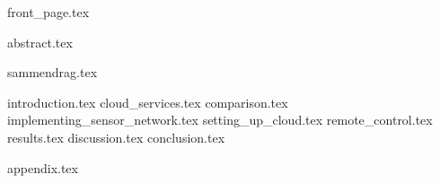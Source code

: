 \documentclass[dvipsnames, b5paper, twoside, openright]{report}
\begin{document}
{front_page.tex}



\setcounter{page}{1}
\setcounter{tocdepth}{3}

\let\cleardoublepage\clearpage
{abstract.tex}


\let\cleardoublepage\clearpage
{sammendrag.tex}


\let\cleardoublepage\clearpage
\tableofcontents
{}

\let\cleardoublepage\clearpage
\listoffigures                                  
{}
\cleardoublepage



\setcounter{page}{1}
\fancyhead[LE,RO]{\itshape \nouppercase \rightmark}
\pagestyle{fancy}

\let\cleardoublepage\clearpage
{introduction.tex}
\let\cleardoublepage\clearpage
{cloud_services.tex}
\let\cleardoublepage\clearpage
{comparison.tex}
\let\cleardoublepage\clearpage
{implementing_sensor_network.tex}
\let\cleardoublepage\clearpage
{setting_up_cloud.tex}
\let\cleardoublepage\clearpage
{remote_control.tex}
\let\cleardoublepage\clearpage
{results.tex}
\let\cleardoublepage\clearpage
{discussion.tex}
\let\cleardoublepage\clearpage
{conclusion.tex}


\let\cleardoublepage\clearpage
\printbibliography
\let\cleardoublepage\clearpage
\begin{appendices}
{appendix.tex}
\end{appendices}
\end{document}
